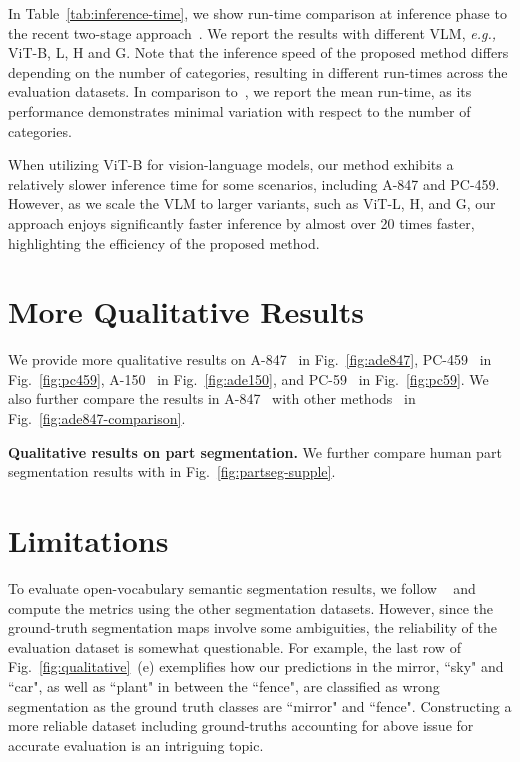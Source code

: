 \documentclass[10pt,twocolumn,letterpaper]{article}
\begin{document}
\begin{table}[H]
\end{table} In Table~\ref{tab:inference-time}, we show run-time comparison at inference phase to the recent two-stage approach~\cite{ding2022decoupling}. We report the results with different VLM, \textit{e.g.,} ViT-B, L, H and G.   Note that the inference speed of the proposed method differs depending on the number of categories, resulting in different run-times across the evaluation datasets. In comparison to~\cite{ding2022decoupling}, we report the mean run-time, as its performance demonstrates minimal variation with respect to the number of categories.

When utilizing ViT-B for vision-language models, our method exhibits a relatively slower inference time for some scenarios, including A-847 and PC-459.  However, as we scale the VLM to larger variants, such as ViT-L, H, and G, our approach enjoys significantly faster inference by almost over 20 times faster, highlighting the efficiency of the proposed method.



\section{More Qualitative Results}\label{C}
We provide more qualitative results on A-847~\cite{zhou2019semantic} in Fig.~\ref{fig:ade847}, PC-459~\cite{mottaghi2014role} in Fig.~\ref{fig:pc459}, A-150~\cite{zhou2019semantic} in Fig.~\ref{fig:ade150}, and PC-59~\cite{mottaghi2014role} in Fig.~\ref{fig:pc59}. We also further compare the results in A-847~\cite{zhou2019semantic} with other methods~\cite{ding2022decoupling, xu2022simple, liang2022open} in Fig.~\ref{fig:ade847-comparison}.

\smallbreak
\noindent\textbf{Qualitative results on part segmentation.}
We further compare human part segmentation results with \cite{liang2022open} in Fig.~\ref{fig:partseg-supple}. 


\section{Limitations}\label{D}
To evaluate open-vocabulary semantic segmentation results, we follow ~\cite{ghiasi2022scaling, liang2022open} and compute the metrics using the other segmentation datasets. However, since the ground-truth segmentation maps involve some ambiguities, the reliability of  the evaluation dataset is somewhat questionable. For example, the last row of Fig.~\ref{fig:qualitative}~(e) exemplifies how our predictions in the mirror, ``sky" and ``car", as well as ``plant" in between the ``fence", are classified as wrong segmentation as the ground truth classes are ``mirror" and ``fence". Constructing a more reliable dataset including ground-truths accounting for above issue for accurate evaluation is an intriguing topic. 
\end{document}
